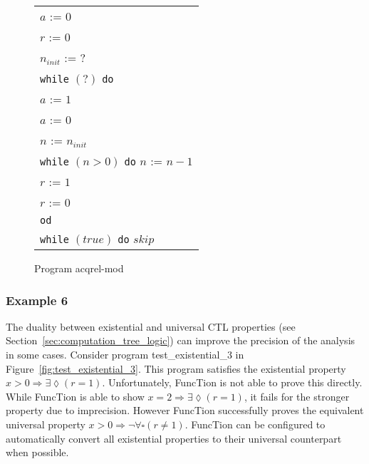 \documentclass[11pt,a4paper,titlepage]{article}
\theoremstyle{definition}
\begin{document}
\begin{figure}
    \begin{center}
        \begin{tabular}{l}
            $a$ := $0$ \\
            $r$ := $0$ \\
            $n_{init}$ := $?$ \\
            \texttt{while} $(?)$ \texttt{do} \\
            \hspace{1em}$a$ := $1$ \\
            \hspace{1em}$a$ := $0$ \\
            \hspace{1em}$n$ := $n_{init}$\\
            \hspace{1em}\texttt{while} $(n > 0)$ \texttt{do} $n$ := $n - 1$ \\
            \hspace{1em}$r$ := $1$ \\
            \hspace{1em}$r$ := $0$ \\
            \texttt{od}\\
            \texttt{while} $(true)$ \texttt{do} $skip$ \\
        \end{tabular}
    \end{center}
    \vspace{-1em}
    \caption{Program \textsf{acqrel-mod}}
    \label{fig:acqrel_mod}
\end{figure}

\subsubsection*{Example 6}

The duality between existential and universal CTL properties (see Section~\ref{sec:computation_tree_logic}) can improve the precision of 
the analysis in some cases.  
Consider program \textsf{test\_existential\_3} in Figure~\ref{fig:test_existential_3}. This program satisfies the existential property 
$x > 0 \Rightarrow \exists\lozenge(r=1)$. Unfortunately, FuncTion is not able to prove this directly. 
While FuncTion is able to show $x = 2 \Rightarrow \exists\lozenge(r=1)$, it fails for the stronger property due to imprecision. 
However FuncTion successfully proves the equivalent universal property $x > 0 \Rightarrow \neg \forall\square(r \neq 1)$. 
FuncTion can be configured to automatically convert all existential properties to their universal counterpart when possible.\\
\end{document}
